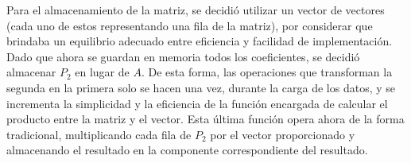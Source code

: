         Para el almacenamiento de la matriz, se decidió utilizar un vector de vectores (cada uno de estos representando una fila de la matriz), por considerar que brindaba un equilibrio adecuado entre eficiencia y facilidad de implementación. Dado que ahora se guardan en memoria todos los coeficientes, se decidió almacenar $P_2$ en lugar de $A$. De esta forma, las operaciones que transforman la segunda en la primera solo se hacen una vez, durante la carga de los datos, y se incrementa la simplicidad y la eficiencia de la función encargada de calcular el producto entre la matriz y el vector. Esta última función opera ahora de la forma tradicional, multiplicando cada fila de $P_2$ por el vector proporcionado y almacenando el resultado en la componente correspondiente del resultado.
